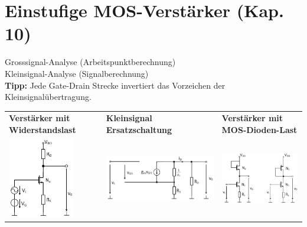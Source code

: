 \newpage
\section{Einstufige MOS-Verstärker (Kap. 10)}
Grosssignal-Analyse (Arbeitspunktberechnung)\\
Kleinsignal-Analyse (Signalberechnung)\\
\textbf{Tipp:} Jede Gate-Drain Strecke invertiert das Vorzeichen der Kleinsignalübertragung.\\
\begin{tabular}{|p{}p{}|p{}|}
	\hline
	\textbf{Verstärker mit Widerstandslast}&\textbf{Kleinsignal Ersatzschaltung}&\textbf{Verstärker mit MOS-Dioden-Last}\\
	\includegraphics[height=3.5cm]{chapters/Verstaerker/images/AmpWiderstand}&
	\includegraphics[height=3.5cm]{chapters/Verstaerker/images/AmpWiderstandKS}&
	\includegraphics[height=3.5cm]{chapters/Verstaerker/images/AmpDiode}\\ 
\end{tabular}\\
